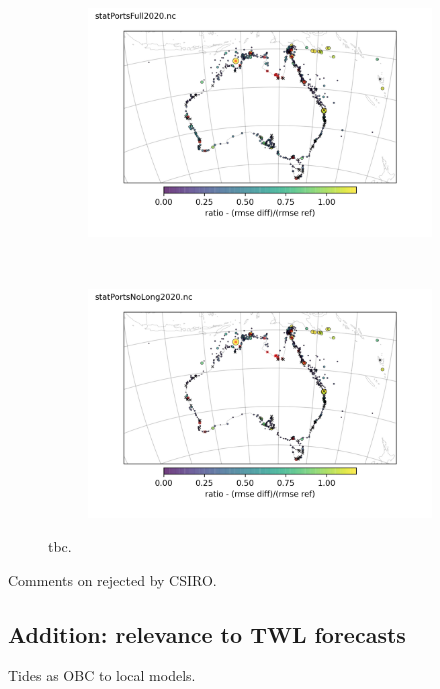 \begin{figure}[H] \centering
    \begin{subfigure}[b]{1.0\textwidth}
        \includegraphics[width=\textwidth]{figures/maps/portsdiffRmseRatioFull.png}
    \end{subfigure}\\
    \begin{subfigure}[b]{1.0\textwidth}
        \includegraphics[width=\textwidth]{figures/maps/portsdiffRmseRatioNoLong.png}
    \end{subfigure}
    \caption{ tbc.}
    \label{fig:map_tc}
\end{figure}   
Comments on rejected by CSIRO.

\subsection{Addition: relevance to TWL forecasts}
Tides as OBC to local models.

